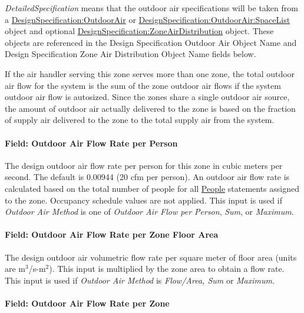 \emph{DetailedSpecification} means that the outdoor air specifications will be taken from a \hyperref[designspecificationoutdoorair]{DesignSpecification:OutdoorAir} or \hyperref[designspecificationoutdoorairspacelist]{DesignSpecification:OutdoorAir:SpaceList} object and optional \hyperref[designspecificationzoneairdistribution]{DesignSpecification:ZoneAirDistribution} object. These objects are referenced in the Design Specification Outdoor Air Object Name and Design Specification Zone Air Distribution Object Name fields below.

If the air handler serving this zone serves more than one zone, the total outdoor air flow for the system is the sum of the zone outdoor air flows if the system outdoor air flow is autosized. Since the zones share a single outdoor air source, the amount of outdoor air actually delivered to the zone is based on the fraction of supply air delivered to the zone to the total supply air from the system.

\paragraph{Field: Outdoor Air Flow Rate per Person}\label{field-outdoor-air-flow-rate-per-person-12}

The design outdoor air flow rate per person for this zone in cubic meters per second. The default is 0.00944 (20 cfm per person). An outdoor air flow rate is calculated based on the total number of people for all \hyperref[people]{People} statements assigned to the zone. Occupancy schedule values are not applied. This input is used if \emph{Outdoor Air Method} is one of \emph{Outdoor Air Flow per Person}, \emph{Sum}, or \emph{Maximum}.

\paragraph{Field: Outdoor Air Flow Rate per Zone Floor Area}\label{field-outdoor-air-flow-rate-per-zone-floor-area-12}

The design outdoor air volumetric flow rate per square meter of floor area (units are m\(^{3}\)/s-m\(^{2}\)). This input is multiplied by the zone area to obtain a flow rate. This input is used if \emph{Outdoor Air Method} is \emph{Flow/Area, Sum} or \emph{Maximum}.

\paragraph{Field: Outdoor Air Flow Rate per Zone}\label{field-outdoor-air-flow-rate-per-zone-12}

